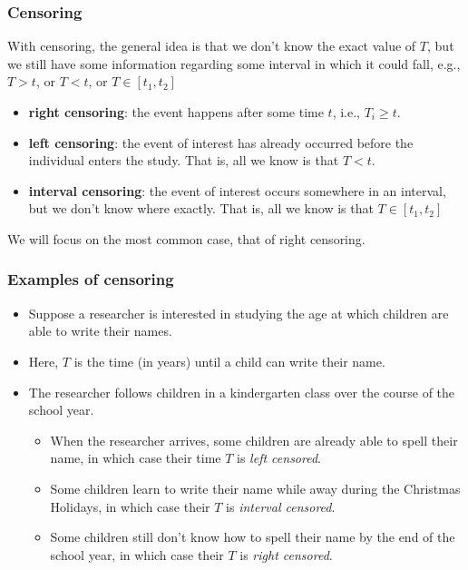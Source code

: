 \documentclass{beamer}
\begin{document}
\begin{frame}
\frametitle{Censoring}
 With censoring, the general idea is that we don't know the exact value of $T$, but we still have some information regarding some interval in which it could fall, e.g., $T>t$, or $T<t$, or $T \in [t_1,t_2]$

\begin{itemize}
\item \textbf{right censoring}: the event happens after some time $t$, i.e., $T_i \geq t$. 
\item \textbf{left censoring}: the event of interest has already occurred before the individual enters the study. That is, all we know is that $T<t$.
\item \textbf{interval censoring}: the event of interest occurs somewhere in an interval, but we don't know where exactly. That is, all we know is that $T \in [t_1,t_2]$
\end{itemize}
We will focus on the most common case, that of right censoring.


\end{frame}

\begin{frame}
\frametitle{Examples of censoring}
\begin{itemize} 
 \item Suppose a researcher is interested in studying the age at which children are able to write their names. 
\item Here, $T$ is the time (in years) until a child can write their name. 
\item The researcher follows children in a kindergarten class over the course of the school year. 
\begin{itemize}
\item 
When the researcher arrives, some children are already able to spell their name, in which case their time $T$ is \emph{left censored}. \item Some children learn to write their name while away during the Christmas Holidays, in which case their $T$ is \emph{interval censored}. 
\item Some children still don't know how to spell their name by the end of the school year, in which case their $T$ is \emph{right censored}.
\end{itemize}
\end{itemize}
\end{frame}
\end{document}
